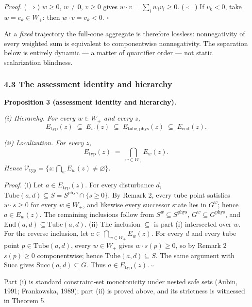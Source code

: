 \documentclass[11pt]{article}
\begin{document}
\emph{Proof.} (\(\Rightarrow\)) \(w \ge 0\), \(w \neq 0\), \(v \ge 0\)
gives \(w \cdot v = \sum_i w_i v_i \ge 0\). (\(\Leftarrow\)) If
\(v_k < 0\), take \(w = e_k \in W_+\): then \(w \cdot v = v_k < 0\). \ensuremath{\square}

At a \emph{fixed} trajectory the full-cone aggregate is therefore lossless: nonnegativity of every weighted sum is equivalent to componentwise nonnegativity. The separation below is entirely dynamic --- a matter of quantifier order --- not static scalarization blindness.

\subsubsection{4.3 The assessment identity and
hierarchy}\label{the-assessment-identity-and-hierarchy}

\textbf{Proposition 3 (assessment identity and hierarchy).}

\emph{(i) Hierarchy.} \emph{For every \(w \in W_+\) and every \(z\),}
\[E_{\mathrm{typ}}(z) \;\subseteq\; E_w(z) \;\subseteq\; E_{\mathrm{tube,phys}}(z) \;\subseteq\; E_{\mathrm{end}}(z).\]

\emph{(ii) Localization.} \emph{For every \(z\),}
\[E_{\mathrm{typ}}(z) \;=\; \bigcap_{w \in W_+} E_w(z).\] \emph{Hence
\(\mathcal{V}_{\mathrm{typ}} = \{ z : \bigcap_w E_w(z) \neq \varnothing \}\).}

\emph{Proof.} (i) Let \(a \in E_{\mathrm{typ}}(z)\). For every
disturbance \(d\),
\(\mathrm{Tube}(a,d) \subseteq S = S^{\mathrm{phys}} \cap \{s \ge 0\}\).
By Remark 2, every tube point satisfies \(w \cdot s \ge 0\) for every
\(w \in W_+\), and likewise every successor state lies in \(G^w\); hence
\(a \in E_w(z)\). The remaining inclusions follow from
\(S^w \subseteq S^{\mathrm{phys}}\),
\(G^w \subseteq G^{\mathrm{phys}}\), and
\(\mathrm{End}(a,d) \subseteq \mathrm{Tube}(a,d)\). (ii) The inclusion
\(\subseteq\) is part (i) intersected over \(w\). For the reverse
inclusion, let \(a \in \bigcap_{w \in W_+} E_w(z)\). For every \(d\) and
every tube point \(p \in \mathrm{Tube}(a,d)\), every \(w \in W_+\) gives
\(w \cdot s(p) \ge 0\), so by Remark 2 \(s(p) \ge 0\) componentwise;
hence \(\mathrm{Tube}(a,d) \subseteq S\). The same argument with
\(\mathrm{Succ}\) gives \(\mathrm{Succ}(a,d) \subseteq G\). Thus
\(a \in E_{\mathrm{typ}}(z)\). \ensuremath{\square}

Part (i) is standard constraint-set monotonicity under nested safe sets (Aubin, 1991; Frankowska, 1989); part (ii) is proved above, and its strictness is witnessed in Theorem 5.
\end{document}
